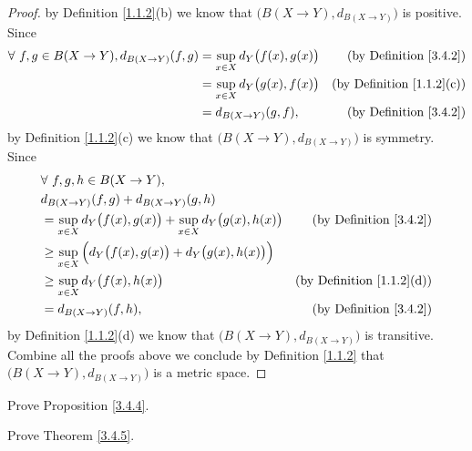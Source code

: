 \begin{proof}
    by Definition \ref{1.1.2}(b) we know that \(\big(B(X \to Y), d_{B(X \to Y)}\big)\) is positive.
    Since
    \begin{align*}
        \forall\ f, g \in B(X \to Y), d_{B(X \to Y)}(f, g) & = \sup_{x \in X} d_Y\big(f(x), g(x)\big) & \text{(by Definition \ref{3.4.2})}    \\
                                                           & = \sup_{x \in X} d_Y\big(g(x), f(x)\big) & \text{(by Definition \ref{1.1.2}(c))} \\
                                                           & = d_{B(X \to Y)}(g, f),                  & \text{(by Definition \ref{3.4.2})}
    \end{align*}
    by Definition \ref{1.1.2}(c) we know that \(\big(B(X \to Y), d_{B(X \to Y)}\big)\) is symmetry.
    Since
    \begin{align*}
         & \forall\ f, g, h \in B(X \to Y),                                                                                          \\
         & d_{B(X \to Y)}(f, g) + d_{B(X \to Y)}(g, h)                                                                               \\
         & = \sup_{x \in X} d_Y\big(f(x), g(x)\big) + \sup_{x \in X} d_Y\big(g(x), h(x)\big) & \text{(by Definition \ref{3.4.2})}    \\
         & \geq \sup_{x \in X} \Big(d_Y\big(f(x), g(x)\big) + d_Y\big(g(x), h(x)\big)\Big)                                           \\
         & \geq \sup_{x \in X} d_Y\big(f(x), h(x)\big)                                       & \text{(by Definition \ref{1.1.2}(d))} \\
         & = d_{B(X \to Y)}(f, h),                                                           & \text{(by Definition \ref{3.4.2})}
    \end{align*}
    by Definition \ref{1.1.2}(d) we know that \(\big(B(X \to Y), d_{B(X \to Y)}\big)\) is transitive.
    Combine all the proofs above we conclude by Definition \ref{1.1.2} that \(\big(B(X \to Y), d_{B(X \to Y)}\big)\) is a metric space.
\end{proof}

\begin{exercise}\label{ex 3.4.2}
    Prove Proposition \ref{3.4.4}.
\end{exercise}

\begin{exercise}\label{ex 3.4.3}
    Prove Theorem \ref{3.4.5}.
\end{exercise}

